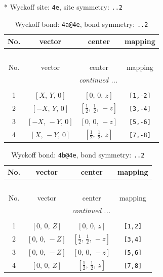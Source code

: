 \documentclass[fleqn,8pt]{jsarticle}
\begin{document}
* Wyckoff site: {\tt 4e}, site symmetry: {\tt ..2}
\renewcommand{\arraystretch}{1.2}
\begin{longtable}{cccc}
\caption{Wyckoff bond: {\tt 4a@4e}, bond symmetry: {\tt ..2}}
 \\
 \hline \hline
No. & vector & center & mapping \\ \hline \endfirsthead

\multicolumn{3}{l}{\tablename\ \thetable{}} \\
 \hline \hline
No. & vector & center & mapping \\ \hline \endhead

 \hline \hline
\multicolumn{3}{r}{\footnotesize\it continued ...} \\ \endfoot

 \hline \hline
\multicolumn{3}{r}{} \\ \endlastfoot

1 & $\left[ X,\, Y,\, 0 \right]$ & $\left[ 0,\, 0,\, z \right]$ & {\tt [1,-2]} \\ \hline
2 & $\left[ - X,\, Y,\, 0 \right]$ & $\left[ \frac{1}{2},\, \frac{1}{2},\, - z \right]$ & {\tt [3,-4]} \\ \hline
3 & $\left[ - X,\, - Y,\, 0 \right]$ & $\left[ 0,\, 0,\, - z \right]$ & {\tt [5,-6]} \\ \hline
4 & $\left[ X,\, - Y,\, 0 \right]$ & $\left[ \frac{1}{2},\, \frac{1}{2},\, z \right]$ & {\tt [7,-8]} \\
\end{longtable}
\renewcommand{\arraystretch}{1.2}
\begin{longtable}{cccc}
\caption{Wyckoff bond: {\tt 4b@4e}, bond symmetry: {\tt ..2}}
 \\
 \hline \hline
No. & vector & center & mapping \\ \hline \endfirsthead

\multicolumn{3}{l}{\tablename\ \thetable{}} \\
 \hline \hline
No. & vector & center & mapping \\ \hline \endhead

 \hline \hline
\multicolumn{3}{r}{\footnotesize\it continued ...} \\ \endfoot

 \hline \hline
\multicolumn{3}{r}{} \\ \endlastfoot

1 & $\left[ 0,\, 0,\, Z \right]$ & $\left[ 0,\, 0,\, z \right]$ & {\tt [1,2]} \\ \hline
2 & $\left[ 0,\, 0,\, - Z \right]$ & $\left[ \frac{1}{2},\, \frac{1}{2},\, - z \right]$ & {\tt [3,4]} \\ \hline
3 & $\left[ 0,\, 0,\, - Z \right]$ & $\left[ 0,\, 0,\, - z \right]$ & {\tt [5,6]} \\ \hline
4 & $\left[ 0,\, 0,\, Z \right]$ & $\left[ \frac{1}{2},\, \frac{1}{2},\, z \right]$ & {\tt [7,8]} \\
\end{longtable}
\end{document}
